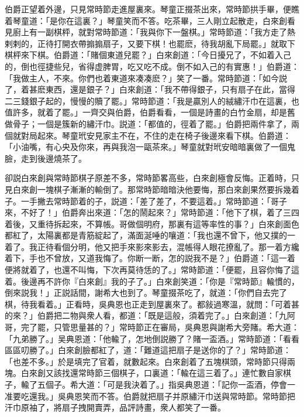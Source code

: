 伯爵正望着外邊，只見常時節走進屋裏來。琴童正掇茶出來，常時節拱手畢，便瞧着琴童道：「是你在這裏？」琴童笑而不答。吃茶畢，三人剛立起散走，白來創看見廚上有一副棋枰，就對常時節道：「我與你下一盤棋。」常時節道：「我方走了熱剌剌的，正待打開衣帶搧搧扇子，又要下棋！也罷麽，待我胡亂下局罷。」就取下棋枰來下棋。伯爵道：「賭個東道兒罷？」白來創道：「今日擾兄了，不如着入己的，倒也徑捷些兒，省得虚脾胃，吃又吃不成。倒不如入己的有實惠！」伯爵道：「我做主人，不來。你們也着東道來凑凑麽？」笑了一番。常時節道：「如今説了，着甚麽東西，還是銀子？」白來創道：「我不帶得銀子，只有扇子在此，當得二三錢銀子起的，慢慢的贖了罷。」常時節道：「我是贏別人的絨繡汗巾在這裏，也值許多，就着了罷。」一齊交與伯爵，伯爵看看，一個是詩畫的白竹金扇，却是舊做骨子；一個是簇新的繡汗巾。説道：「都值的，徑着了罷。」伯爵把兩件拿了，兩個就對局起來。琴童玳安見家主不在，不住的走在椅子後邊來看下棋。伯爵道：「小油嘴，有心央及你來，再與我泡一甌茶來。」琴童就對玳安暗暗裏做了一個鬼臉，走到後邊燒茶了。

卻説白來創與常時節棋子原差不多，常時節畧高些，白來創極會反悔。正着時，只見白來創一塊棋子漸漸的輸倒了。那常時節暗暗決他要悔，那白來創果然要拆幾着子。一手撇去常時節着的子，説道：「差了差了，不要這着。」常時節道：「哥子來，不好了！」伯爵奔出來道：「怎的鬧起來？」常時節道：「他下了棋，着了三四着後，又重待拆起來，不算帳。哥做個明府，那裏有這等率性的事？」白來創面色都紅了，太陽裏都是青筋綻起了，滿面涎唾的嚷道：「我也還不曾下，他又撲的一着了。我正待看個分明，他又把手來影來影去，混帳得人眼花撩亂了。那一着方纔着下，手也不曾放，又道我悔了。你断一断，怎的説我不是？」伯爵道：「這一着便將就着了，也還不叫悔，下次再莫待恁的了。」常時節道：「便罷，且容你悔了這着。後邊再不許你『白來創』我的子了。」白來創笑道：「你是『常時節』輸慣的，倒來説我！」正説話間，謝希大也到了。琴童掇茶吃了，就道：「你們自去完了棋，待我看着。」正看時，吳典恩也正走到屋裏來了。都敍過寒溫，就問：「可着甚的來？」伯爵把二物與衆人看，都道：「既是這般，須着完了。」白來創道：「九阿哥，完了罷，只管思量甚的？」常時節正在審局，吳典恩與謝希大旁賭。希大道：「九弟勝了。」吴典恩道：「他輸了，怎地倒説勝了？賭一盃酒。」常時節道：「看看區區叨勝了。」白來創臉都紅了，道：「難道這把扇子是送你的了？」常時節道：「也差不多。」於是填完了官着，就數起來。白來創着了五塊棋頭，常時節只得兩塊。白來創又該找還常時節三個棋子，口裏道：「輸在這三着了。」連忙數自家棋子，輸了五個子。希大道：「可是我決着了。」指吳典恩道：「記你一盃酒，停會一准要吃還我。」吳典恩笑而不答。伯爵就把扇子并原繡汗巾送與常時節。常時節把汗巾原袖了，將扇子拽開賣弄，品評詩畫，衆人都笑了一番。

